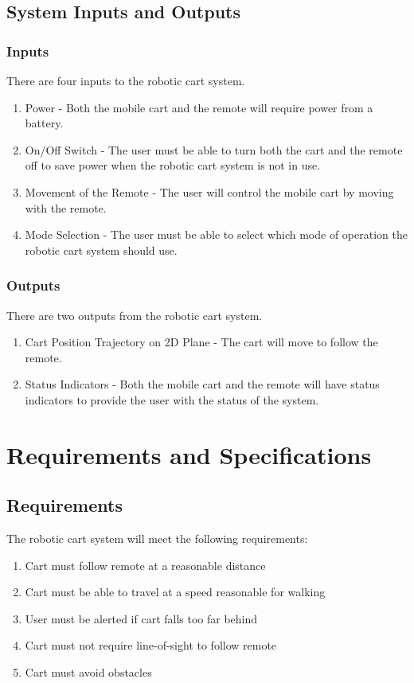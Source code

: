 \documentclass[12pt]{article} %
\begin{document}
\subsection{System Inputs and Outputs}
\subsubsection{Inputs}
There are four inputs to the robotic cart system.
\begin{enumerate}
    \item Power - Both the mobile cart and the remote will require power from a battery.
    \item On/Off Switch - The user must be able to turn both the cart and the remote off to save power when the robotic cart system is not in use.
    \item Movement of the Remote - The user will control the mobile cart by moving with the remote.
    \item Mode Selection - The user must be able to select which mode of operation the robotic cart system should use.
\end{enumerate}

\subsubsection{Outputs}
There are two outputs from the robotic cart system.
\begin{enumerate}
    \item Cart Position Trajectory on 2D Plane - The cart will move to follow the remote.
    \item Status Indicators - Both the mobile cart and the remote will have status indicators to provide the user with the status of the system.
\end{enumerate}

\section{Requirements and Specifications}
\subsection{Requirements}
The robotic cart system will meet the following requirements:
\begin{enumerate}
    \item Cart must follow remote at a reasonable distance
    \item Cart must be able to travel at a speed reasonable for walking
    \item User must be alerted if cart falls too far behind
    \item Cart must not require line-of-sight to follow remote
    \item Cart must avoid obstacles
\end{enumerate}
\end{document}
